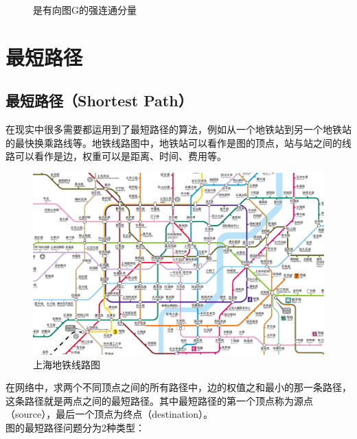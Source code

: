 \begin{figure}[H]
	\centering
	\caption{是有向图G的强连通分量}
\end{figure}

\newpage

\section{最短路径}

\subsection{最短路径（Shortest Path）}

在现实中很多需要都运用到了最短路径的算法，例如从一个地铁站到另一个地铁站的最快换乘路线等。地铁线路图中，地铁站可以看作是图的顶点，站与站之间的线路可以看作是边，权重可以是距离、时间、费用等。\\

\begin{figure}[H]
	\centering
	\includegraphics[scale=0.3]{img/Chapter8/8-6/1.png}
	\caption{上海地铁线路图}
\end{figure}

在网络中，求两个不同顶点之间的所有路径中，边的权值之和最小的那一条路径，这条路径就是两点之间的最短路径。其中最短路径的第一个顶点称为源点（source），最后一个顶点为终点（destination）。\\

图的最短路径问题分为2种类型：


